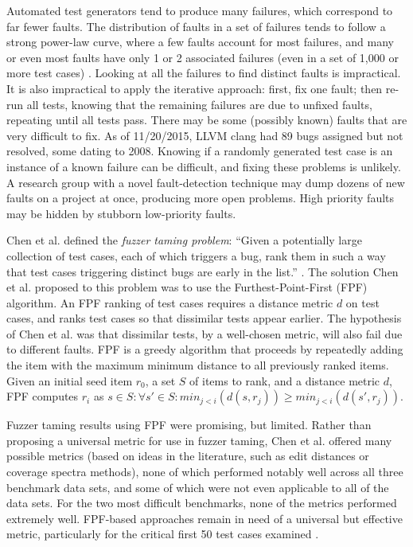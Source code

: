 Automated test generators tend to produce many failures, which correspond to far fewer faults.  The distribution of faults in a set of failures tends to follow a strong power-law curve, where a few faults account for most failures, and many or even most faults have only 1 or 2 associated failures (even in a set of 1,000 or more test cases) \cite{PLDI13}.  Looking at all the failures to find  distinct faults is impractical.  It is also impractical to apply the iterative approach:  first, fix one fault; then re-run all tests, knowing that the remaining failures are due to unfixed faults, repeating until all tests pass.  There may be some (possibly known) faults that are very difficult to fix. As of 11/20/2015, LLVM clang had 89 bugs assigned but not resolved, some dating to 2008.  Knowing if a randomly generated test case is an instance of a known failure can be difficult, and fixing these problems is unlikely.    A research group with a novel fault-detection technique \cite{csmith,ISSTA12,ZhendongPLDI} may dump dozens of new faults on a project at once, producing more open problems.   High priority faults may be hidden by stubborn low-priority faults.

Chen et al. defined the \emph{fuzzer taming problem}: ``Given a potentially large collection of test cases, each of which triggers a bug, rank them in such a way that test cases triggering distinct bugs are early in the list.'' \cite{PLDI13}.  The solution Chen et al. proposed to this problem was to use the Furthest-Point-First \cite{Gonzalez} (FPF) algorithm.  An FPF ranking of test cases requires a distance metric $d$ on test cases, and ranks test cases so that dissimilar tests appear earlier.  The hypothesis of Chen et al. was that dissimilar tests, by a well-chosen metric, will also fail due to different faults.
FPF is a greedy algorithm that proceeds by repeatedly adding the item with the maximum minimum distance to all previously ranked items. Given an initial seed item $r_0$, a set
$S$ of items to rank, and a distance metric $d$, FPF computes $r_i$ as $s \in S: \forall s' \in S: min_{ j < i}(d(s,r_j)) \geq min_{j < i}(d(s',r_j))$.


Fuzzer taming results using FPF were promising, but limited.  Rather than proposing a universal metric for use in fuzzer taming, Chen et al. offered many possible metrics (based on ideas in the literature, such as edit distances \cite{lev} or coverage spectra \cite{RepsSpectra} methods), none of which performed notably well across all three benchmark data sets, and some of which were not even applicable to all of the data sets.  For the two most difficult benchmarks, none of the metrics performed extremely well. FPF-based approaches remain in need of a universal but effective metric, particularly for the critical first 50 test cases examined \cite{PLDI13}.


